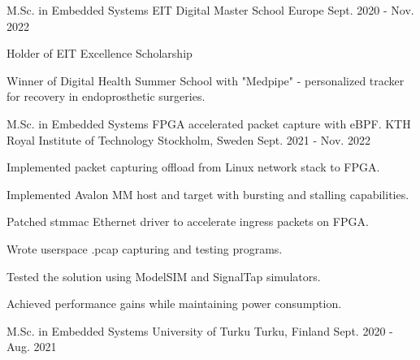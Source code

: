 

\begin{cventries}

  \cventry
    {M.Sc. in Embedded Systems} %
    {EIT Digital Master School} %
    {Europe} %
    {Sept. 2020 - Nov. 2022} %
    {
        \begin{cvitems}
            \item { Holder of EIT Excellence Scholarship }
            \item { Winner of Digital Health Summer School with "Medpipe" - personalized tracker for recovery in endoprosthetic surgeries. }
        \end{cvitems}
    }

  \cventry
    {M.Sc. in Embedded Systems \newline FPGA accelerated packet capture with eBPF.} %
    {KTH Royal Institute of Technology} %
    {Stockholm, Sweden} %
    {Sept. 2021 - Nov. 2022} %
    {
        \begin{cvitems}
            \item { Implemented packet capturing offload from Linux network stack to FPGA. }
            \item { Implemented Avalon MM host and target with bursting and stalling capabilities. }
            \item { Patched stmmac Ethernet driver to accelerate ingress packets on FPGA. }
            \item { Wrote userspace .pcap capturing and testing programs. }
            \item { Tested the solution using ModelSIM and SignalTap simulators. }
            \item { Achieved performance gains while maintaining power consumption. }
        \end{cvitems}
    }

  \cventry
    {M.Sc. in Embedded Systems} %
    {University of Turku} %
    {Turku, Finland} %
    {Sept. 2020 - Aug. 2021} %
    {}



\end{cventries}
